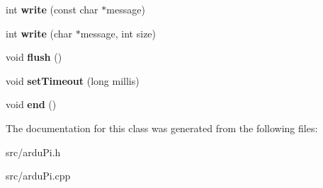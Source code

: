 \begin{DoxyCompactItemize}
\item 
\hypertarget{class_serial_pi_a6418cab2b472be7c69754937a45dfd8b}{}int {\bfseries write} (const char $\ast$message)\label{class_serial_pi_a6418cab2b472be7c69754937a45dfd8b}

\item 
\hypertarget{class_serial_pi_aac9e5875ecb297da8a37f80430b2aaed}{}int {\bfseries write} (char $\ast$message, int size)\label{class_serial_pi_aac9e5875ecb297da8a37f80430b2aaed}

\item 
\hypertarget{class_serial_pi_a81d24e8d8f6ac8010171a87e7807b618}{}void {\bfseries flush} ()\label{class_serial_pi_a81d24e8d8f6ac8010171a87e7807b618}

\item 
\hypertarget{class_serial_pi_a05ff66817a299691df92c9b9cb7f1c20}{}void {\bfseries set\+Timeout} (long millis)\label{class_serial_pi_a05ff66817a299691df92c9b9cb7f1c20}

\item 
\hypertarget{class_serial_pi_a032717a822c95184793b6e01d26ccc56}{}void {\bfseries end} ()\label{class_serial_pi_a032717a822c95184793b6e01d26ccc56}

\end{DoxyCompactItemize}


The documentation for this class was generated from the following files\+:\begin{DoxyCompactItemize}
\item 
src/ardu\+Pi.\+h\item 
src/ardu\+Pi.\+cpp\end{DoxyCompactItemize}
